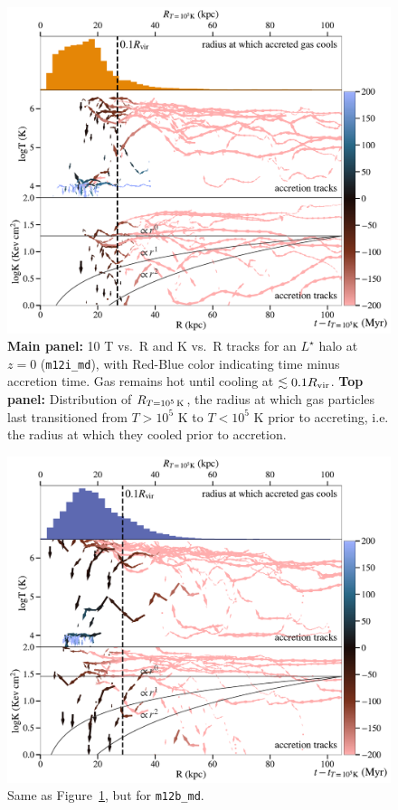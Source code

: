 \documentclass[fleqn,usenatbib]{mnras}
\newcommand{\Rcool}{R_{T=10^5\,{\rm K}}}
\begin{document}
\begin{figure}
    \centering
    \includegraphics[width=\columnwidth]{figures/tracks_m12i_md.pdf}
    \caption{
    \textbf{Main panel:} 10 T vs.\ R and K vs.\ R tracks for an $L^\star$ halo at $z=0$ (\texttt{m12i\_md}), with Red-Blue color indicating time minus accretion time.
    Gas remains hot until cooling at $\lesssim 0.1 R_{\rm vir}$.
    \textbf{Top panel:} Distribution of $\Rcool$, the radius at which gas particles last transitioned from $T > 10^5$ K to $T < 10^5$ K prior to accreting, i.e. the radius at which they cooled prior to accretion.
    }
    \label{f: T vs R}
\end{figure}

\begin{figure}
    \centering
    \includegraphics[width=\columnwidth]{figures/tracks_m12b_md.pdf}
    \caption{
    Same as Figure~\ref{f: T vs R}, but for \texttt{m12b\_md}.
    }
    \label{f: T vs R m12b_md}
\end{figure}
\end{document}

